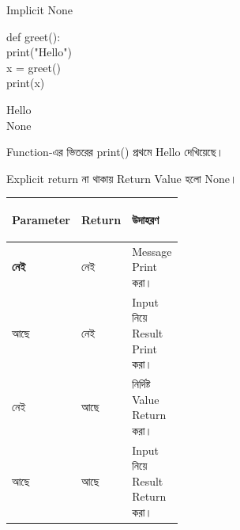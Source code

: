 \begin{codeoutputbox}{Implicit \textenglish{\ttfamily None}}

\noindent
\begin{minipage}[t]{0.52\linewidth}
\codeheading

\begin{english}
\ttfamily
def greet():\\
\hspace*{4mm}print("Hello")\\[0.5mm]
x = greet()\\
print(x)
\end{english}

\end{minipage}
\hfill
\begin{minipage}[t]{0.44\linewidth}
\outputheading

\begin{english}
\ttfamily
Hello\\
None
\end{english}

\medskip

Function-এর ভিতরের
\textenglish{\ttfamily print()}
প্রথমে
\textenglish{\ttfamily Hello}
দেখিয়েছে।

Explicit
\textenglish{\ttfamily return}
না থাকায় Return Value হলো
\textenglish{\ttfamily None}।

\end{minipage}

\end{codeoutputbox}



\begin{tabularx}
{\linewidth}
{
|>{\bfseries\centering\arraybackslash}p{0.22\linewidth}
|>{\centering\arraybackslash}p{0.21\linewidth}
|Y|
}

\hline
{}

\textbf{Parameter}
&
\textbf{Return}
&
\textbf{উদাহরণ}
\\
\hline

নেই
&
নেই
&
Message Print করা।
\\
\hline

আছে
&
নেই
&
Input নিয়ে Result Print করা।
\\
\hline

নেই
&
আছে
&
নির্দিষ্ট Value Return করা।
\\
\hline

আছে
&
আছে
&
Input নিয়ে Result Return করা।
\\
\hline

\end{tabularx}

